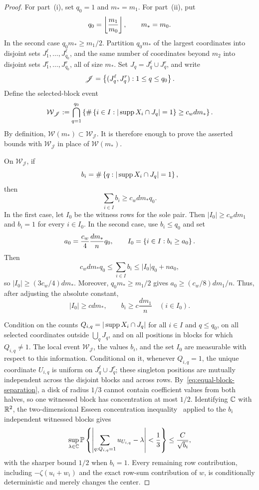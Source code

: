 \begin{proof}
For part~(i), set $q_0=1$ and $m_*=m_1$. For part~(ii), put
\[
  q_0=\left\lfloor \frac{m_1}{m_0}\right\rfloor,
  \qquad
  m_*=m_0.
\]
In the second case $q_0m_*\ge m_1/2$. Partition $q_0m_*$ of the largest coordinates into disjoint sets $J_1^\ell,\ldots,J_{q_0}^\ell$, and the same number of coordinates beyond $m_2$ into disjoint sets $J_1^r,\ldots,J_{q_0}^r$, all of size $m_*$. Set $J_q=J_q^\ell\cup J_q^r$, and write
\[
  \mathscr J=\left\{(J_q^\ell,J_q^r):1\le q\le q_0\right\}.
\]
Define the selected-block event
\[
  \mathcal W_{\mathscr J}
  :=\bigcap_{q=1}^{q_0}
  \left\{\#\left\{i\in I:|\operatorname{supp} X_i\cap J_q|=1\right\}\ge c_wdm_*\right\}.
\]
By definition, $\mathcal W(m_*)\subset\mathcal W_{\mathscr J}$. It is therefore enough to prove the asserted bounds with $\mathcal W_{\mathscr J}$ in place of $\mathcal W(m_*)$.

On $\mathcal W_{\mathscr J}$, if
\[
  b_i=\#\left\{q:|\operatorname{supp} X_i\cap J_q|=1\right\},
\]
then
\begin{equation}\label{eq:sum-bi}
  \sum_{i\in I}b_i\ge c_wdm_*q_0.
\end{equation}
In the first case, let $I_0$ be the witness rows for the sole pair. Then $|I_0|\ge c_wdm_1$ and $b_i=1$ for every $i\in I_0$. In the second case, use $b_i\le q_0$ and set
\[
  a_0=\frac{c_w}{4}\frac{dm_*}{n}q_0,
  \qquad
  I_0=\left\{i\in I:b_i\ge a_0\right\}.
\]
Then
\[
  c_wdm_*q_0\le\sum_{i\in I}b_i\le|I_0|q_0+na_0,
\]
so $|I_0|\ge(3c_w/4)dm_*$. Moreover, $q_0m_*\ge m_1/2$ gives $a_0\ge(c_w/8)dm_1/n$. Thus, after adjusting the absolute constant,
\begin{equation}\label{eq:I0-bi}
  |I_0|\ge cdm_*,
  \qquad
  b_i\ge c\frac{dm_1}{n}
  \quad(i\in I_0).
\end{equation}

Condition on the counts $Q_{i,q}=|\operatorname{supp} X_i\cap J_q|$ for all $i\in I$ and $q\le q_0$, on all selected coordinates outside $\bigcup_qJ_q$, and on all positions in blocks for which $Q_{i,q}\ne1$. The local event $\mathcal W_{\mathscr J}$, the values $b_i$, and the set $I_0$ are measurable with respect to this information. Conditional on it, whenever $Q_{i,q}=1$, the unique coordinate $U_{i,q}$ is uniform on $J_q^\ell\cup J_q^r$; these singleton positions are mutually independent across the disjoint blocks and across rows. By~\eqref{eq:equal-block-separation}, a disk of radius $1/3$ cannot contain coefficient values from both halves, so one witnessed block has concentration at most $1/2$. Identifying $\mathbb C$ with $\mathbb R^2$, the two-dimensional Esseen concentration inequality~\cite[Proposition~2.2]{LLTTY19} applied to the $b_i$ independent witnessed blocks gives
\begin{equation}\label{eq:block-Esseen}
  \sup_{\lambda\in\mathbb C}
  \mathbb P\left\{\left|\sum_{q:Q_{i,q}=1}u_{U_{i,q}}-\lambda\right|<\frac13\right\}
  \le\frac C{\sqrt{b_i}},
\end{equation}
with the sharper bound $1/2$ when $b_i=1$. Every remaining row contribution, including $-\zeta(u_i+w_i)$ and the exact row-sum contribution of $w$, is conditionally deterministic and merely changes the center.


\end{proof}
